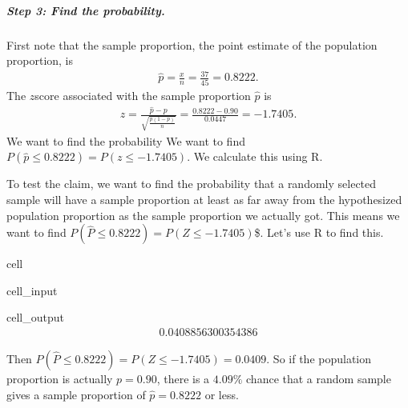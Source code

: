 \documentclass[letterpaper,10pt,english]{jupyterBook}
\begin{document}
\subparagraph{Step 3: Find the probability.}
\label{\detokenize{Ch6 An Introduction to Hypothesis Testing/6.1 An Introduction to Hypothesis Testing:id4}}
\sphinxAtStartPar
First note that the sample proportion, the point estimate of the population proportion, is
\begin{equation*}
\begin{split} \hat{p} = \frac{x}{n} = \frac{37}{45} = 0.8222. \end{split}
\end{equation*}
\sphinxAtStartPar
The \(z\)\sphinxhyphen{}score associated with the sample proportion \(\hat{p}\) is
\begin{equation*}
\begin{split}z = \frac{\hat{p} - p}{\sqrt{\frac{p(1-p)}{n}}} = \frac{0.8222 - 0.90}{0.0447} = -1.7405.\end{split}
\end{equation*}
\sphinxAtStartPar
We want to find the probability We want to find \(P(\hat{p} \leq 0.8222) = P(z \leq -1.7405)\). We calculate this using R.

\sphinxAtStartPar
To test the claim, we want to find the probability that a randomly selected sample will have a sample proportion at least as far away from the hypothesized population proportion as the sample proportion we actually got. This means we want to find \(P(\hat{P} \leq 0.8222) = P(Z \leq -1.7405)\)\$. Let’s use R to find this.

\begin{sphinxuseclass}{cell}\begin{sphinxVerbatimInput}

\begin{sphinxuseclass}{cell_input}
\begin{sphinxVerbatim}[commandchars=\\\{\}]
\end{sphinxVerbatim}

\end{sphinxuseclass}\end{sphinxVerbatimInput}
\begin{sphinxVerbatimOutput}

\begin{sphinxuseclass}{cell_output}\begin{equation*}
\begin{split}0.0408856300354386\end{split}
\end{equation*}
\end{sphinxuseclass}\end{sphinxVerbatimOutput}

\end{sphinxuseclass}
\sphinxAtStartPar
Then \(P(\hat{P} \leq 0.8222) = P(Z \leq -1.7405) = 0.0409\). So if the population proportion is actually \(p = 0.90\), there is a \(4.09\%\) chance that a random sample gives a sample proportion of \(\hat{p} = 0.8222\) or less.
\end{document}
